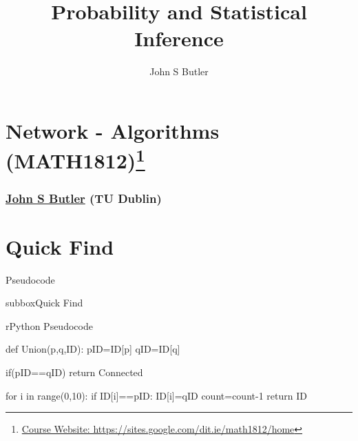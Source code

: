 \documentclass[10pt,a4paper]{article}
\title{Probability and Statistical Inference}
\author{John S Butler}
\begin{document}
\thispagestyle{empty}
\scriptsize


\section*{Network - Algorithms  (MATH1812)\footnote{\href{https://sites.google.com/dit.ie/math1812/home}{Course Website: https://sites.google.com/dit.ie/math1812/home}}}
\subsubsection*{\href{johnsbutler.netlify.com}{John S Butler} (TU Dublin) }


\section*{Quick Find}
\begin{textbox}{Pseudocode}
\begin{subbox}{subbox}{Quick Find}
\begin{codebox}{r}{Python Pseudocode}

def Union(p,q,ID):
	pID=ID[p]
	qID=ID[q]

	if(pID==qID)
		return Connected

	 for i in range(0,10): 
		if ID[i]==pID:
			ID[i]=qID
	count=count-1	
    return ID
\end{codebox}
\end{subbox}
\end{textbox}
\end{document}
